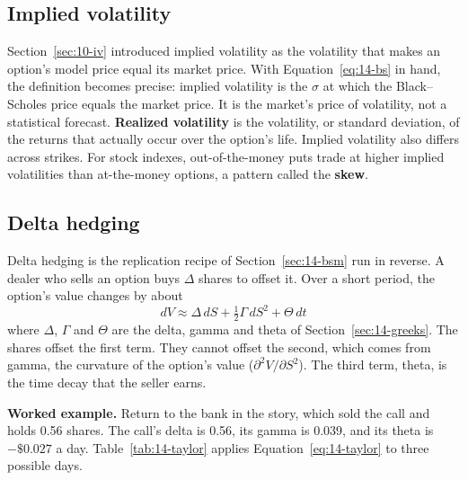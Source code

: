 \subsection{Implied volatility}
\label{sec:14-iv}

Section~\ref{sec:10-iv} introduced implied volatility as the volatility that makes an option's model price equal its market price. With Equation~\eqref{eq:14-bs} in hand, the definition becomes precise: implied volatility is the $\sigma$ at which the Black--Scholes price equals the market price. It is the market's price of volatility, not a statistical forecast. \textbf{Realized volatility} is the volatility, or standard deviation, of the returns that actually occur over the option's life. Implied volatility also differs across strikes. For stock indexes, out-of-the-money puts trade at higher implied volatilities than at-the-money options, a pattern called the \textbf{skew}.

\subsection{Delta hedging}

Delta hedging is the replication recipe of Section~\ref{sec:14-bsm} run in reverse. A dealer who sells an option buys $\Delta$ shares to offset it. Over a short period, the option's value changes by about
\begin{equation}
  dV \approx \Delta\,dS + \tfrac{1}{2}\Gamma\,dS^2 + \Theta\,dt
  \label{eq:14-taylor}
\end{equation}
where $\Delta$, $\Gamma$ and $\Theta$ are the delta, gamma and theta of Section~\ref{sec:14-greeks}. The shares offset the first term. They cannot offset the second, which comes from gamma, the curvature of the option's value ($\partial^2 V/\partial S^2$). The third term, theta, is the time decay that the seller earns.

\textbf{Worked example.} Return to the bank in the story, which sold the call and holds 0.56 shares. The call's delta is 0.56, its gamma is 0.039, and its theta is $-\$0.027$ a day. Table~\ref{tab:14-taylor} applies Equation~\eqref{eq:14-taylor} to three possible days.

